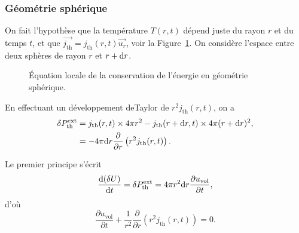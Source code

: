         \subsubsection{Géométrie sphérique}

            On fait l'hypothèse que la température $T(r,t)$ dépend juste du rayon $r$ et du temps $t$, et que $\vec{j_{\text{th}}}=j_{\text{th}}(r,t)\vec{u_r}$, voir la Figure~\ref{fig:equation_locale_conservation_energie_1d_spherique}. On considère l'espace entre deux sphères de rayon $r$ et $r+\mathrm{d} r$.
        
            \begin{figure}
                \centering
                \caption{Équation locale de la conservation de l'énergie en géométrie sphérique.}    
                \label{fig:equation_locale_conservation_energie_1d_spherique}
            \end{figure}

            En effectuant un développement deTaylor de $r^{2}j_{\text{th}}(r,t)$, on a 
            \begin{align}
                \delta P_{\text{th}}^{\text{ext}}
                &=
                j_{\text{th}}(r,t)\times 4\pi r^{2}-j_{\text{th}}(r+\mathrm{d} r,t)\times4\pi(r+\mathrm{d} r)^{2},\\
                &=-4\pi\mathrm{d} r\frac{\partial}{\partial r}\left(r^{2}j_{\text{th}}(r,t)\right).
            \end{align}

            Le premier principe s'écrit
            \begin{equation}
                \frac{\mathrm{d}(\delta U)}{\mathrm{d} t}=\delta P_{\text{th}}^{\text{ext}}=4\pi r^{2}\mathrm{d} r\frac{\partial u_{\text{vol}}}{\partial t},
            \end{equation}
            d'où
            \begin{equation}
                \boxed{
                    \frac{\partial u_{\text{vol}}}{\partial t}+\frac{1}{r^{2}}\frac{\partial}{\partial r}\left(r^{2}j_{\text{th}}(r,t)\right)=0.
                }
            \end{equation}

